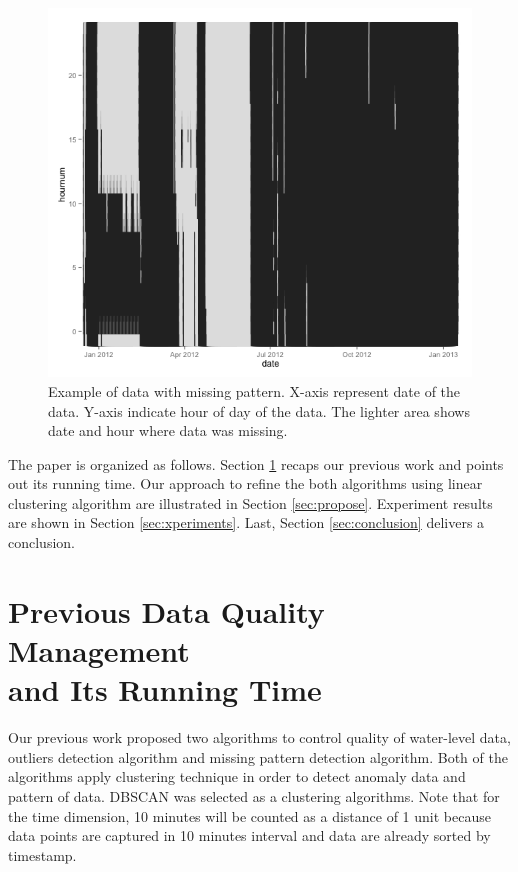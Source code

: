\documentclass[conference]{IEEEtran}
\begin{document}
\begin{figure}
  \includegraphics[width=\linewidth]{figure3.png}
  \caption{Example of data with missing pattern. X-axis represent date of the data. Y-axis indicate hour of day of the data. The lighter area shows date and hour where data was missing.}
  \label{fig:example_missingpattern}
\end{figure}

The paper is organized as follows. Section \ref{sec:previous} recaps our previous work and points out its running time. Our approach to refine the both algorithms using linear clustering algorithm are illustrated in Section \ref{sec:propose}. Experiment results are shown in Section \ref{sec:xperiments}. Last, Section \ref{sec:conclusion} delivers a conclusion.

\section{Previous Data Quality Management\\and Its Running Time} \label{sec:previous}

Our previous work proposed two algorithms to control quality of water-level data, outliers detection algorithm and missing pattern detection algorithm. Both of the algorithms apply clustering technique in order to detect anomaly data and pattern of data. DBSCAN was selected as a clustering algorithms. Note that for the time dimension, 10 minutes will be counted as a distance of 1 unit because data points are captured in 10 minutes interval and data are already sorted by timestamp.
\end{document}
